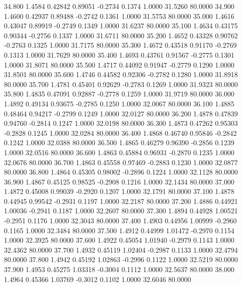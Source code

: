   34.800   1.4584   0.42842   0.89051  -0.2734   0.1374   1.0000  31.5260  80.0000
  34.900   1.4600   0.42937   0.89488  -0.2742   0.1361   1.0000  31.5753  80.0000
  35.000   1.4616   0.43047   0.89919  -0.2749   0.1349   1.0000  31.6237  80.0000
  35.100   1.4634   0.43175   0.90344  -0.2756   0.1337   1.0000  31.6711  80.0000
  35.200   1.4652   0.43328   0.90762  -0.2763   0.1325   1.0000  31.7175  80.0000
  35.300   1.4672   0.43518   0.91170  -0.2769   0.1313   1.0000  31.7629  80.0000
  35.400   1.4693   0.43761   0.91567  -0.2775   0.1301   1.0000  31.8071  80.0000
  35.500   1.4717   0.44092   0.91947  -0.2779   0.1290   1.0000  31.8501  80.0000
  35.600   1.4746   0.44582   0.92306  -0.2782   0.1280   1.0000  31.8918  80.0000
  35.700   1.4781   0.45401   0.92629  -0.2783   0.1269   1.0000  31.9323  80.0000
  35.800   1.4835   0.47091   0.92887  -0.2778   0.1259   1.0000  31.9719  80.0000
  36.000   1.4892   0.49134   0.93675  -0.2785   0.1250   1.0000  32.0067  80.0000
  36.100   1.4885   0.48464   0.94217  -0.2799   0.1249   1.0000  32.0127  80.0000
  36.200   1.4878   0.47839   0.94760  -0.2814   0.1247   1.0000  32.0198  80.0000
  36.300   1.4873   0.47262   0.95303  -0.2828   0.1245   1.0000  32.0284  80.0000
  36.400   1.4868   0.46740   0.95846  -0.2842   0.1242   1.0000  32.0388  80.0000
  36.500   1.4865   0.46279   0.96390  -0.2856   0.1239   1.0000  32.0516  80.0000
  36.600   1.4863   0.45884   0.96931  -0.2870   0.1235   1.0000  32.0676  80.0000
  36.700   1.4863   0.45558   0.97469  -0.2883   0.1230   1.0000  32.0877  80.0000
  36.800   1.4864   0.45305   0.98002  -0.2896   0.1224   1.0000  32.1128  80.0000
  36.900   1.4867   0.45125   0.98525  -0.2908   0.1216   1.0000  32.1434  80.0000
  37.000   1.4872   0.45008   0.99039  -0.2920   0.1207   1.0000  32.1791  80.0000
  37.100   1.4878   0.44945   0.99542  -0.2931   0.1197   1.0000  32.2187  80.0000
  37.200   1.4886   0.44921   1.00036  -0.2941   0.1187   1.0000  32.2607  80.0000
  37.300   1.4894   0.44928   1.00521  -0.2951   0.1176   1.0000  32.3043  80.0000
  37.400   1.4903   0.44956   1.00999  -0.2960   0.1165   1.0000  32.3484  80.0000
  37.500   1.4912   0.44999   1.01472  -0.2970   0.1154   1.0000  32.3925  80.0000
  37.600   1.4922   0.45054   1.01940  -0.2979   0.1143   1.0000  32.4362  80.0000
  37.700   1.4932   0.45119   1.02404  -0.2987   0.1133   1.0000  32.4794  80.0000
  37.800   1.4942   0.45192   1.02863  -0.2996   0.1122   1.0000  32.5219  80.0000
  37.900   1.4953   0.45275   1.03318  -0.3004   0.1112   1.0000  32.5637  80.0000
  38.000   1.4964   0.45366   1.03769  -0.3012   0.1102   1.0000  32.6046  80.0000
